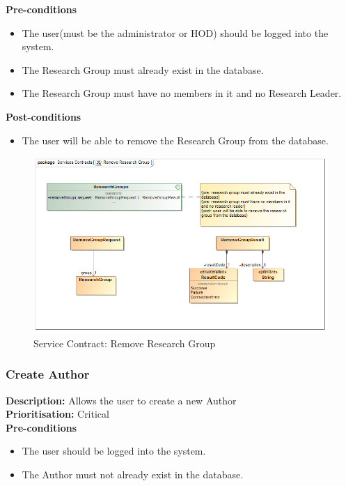 \documentclass[a4paper]{article}
\begin{document}
	\textbf{Pre-conditions}
	 \begin{itemize}
		\item The user(must be the administrator or HOD) should be logged into the system.
		\item The Research Group must already exist in the database.
		\item The Research Group must have no members in it and no Research Leader.
	\end{itemize}
	
	\textbf{Post-conditions}
	 \begin{itemize}
		\item The user will be able to remove the Research Group from the database.
	\end{itemize}
	
	    	\begin{figure}[H]
	    		\centering
	    		\includegraphics[width=\textwidth]{5.1.14.Remove.Research.Group.Services.Contract.png}
	    		\caption{Service Contract: Remove Research Group}
	    	\end{figure}
	
	\pagebreak
	\subsubsection{Create Author}
	\textbf{Description:} Allows the user to create a new Author\\
	\textbf{Prioritisation:} Critical\\
	
	\textbf{Pre-conditions}
	 \begin{itemize}
		\item The user should be logged into the system.
		\item The Author must not already exist in the database.
	\end{itemize}
	
\end{document}

